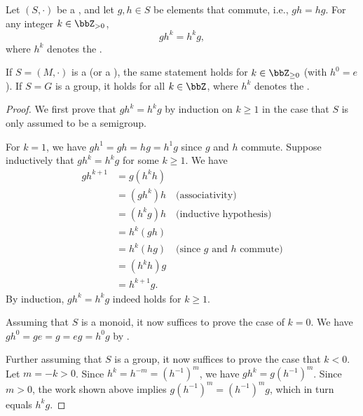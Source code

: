 \begin{lemma} \label{lemma:monoid_element_that_commutes_with_element_commutes_with_power_of_element}
    Let $(S,\cdot)$ be a , and let $g, h \in S$ be elements that commute, i.e., $gh = hg$. For any integer $k \in \bbZ_{>0}$,
    $$g h^k = h^k g,$$
    where $h^k$ denotes the .

    If $S = (M,\cdot)$ is a  (or a ), the same statement holds for $k \in \bbZ_{\geq 0}$ (with $h^0 = e$). If $S = G$ is a group, it holds for all $k \in \bbZ$, where $h^k$ denotes the .
\end{lemma}

\begin{proof}
    We first prove that $g h^k = h^k g$ by induction on $k \geq 1$ in the case that $S$ is only assumed to be a semigroup.

    For $k = 1$, we have $g h^1 = g h = h g = h^1 g$ since $g$ and $h$ commute. Suppose inductively that $g h^k = h^k g$ for some $k \ge 1$. We have
    \begin{align*}
        g h^{k+1} &= g (h^k h) \\
        &= (g h^k) h \quad\text{(associativity)} \\
        &= (h^k g) h \quad\text{(inductive hypothesis)} \\
        &= h^k (g h) \\
        &= h^k (h g) \quad\text{(since $g$ and $h$ commute)} \\
        &= (h^k h) g \\
        &= h^{k+1} g.
    \end{align*}
    By induction, $gh^k = h^kg$ indeed holds for $k \geq 1$.

    Assuming that $S$ is a monoid, it now suffices to prove the case of $k = 0$. We have $g h^0 = g e = g = e g = h^0 g$ by .

    Further assuming that $S$ is a group, it now suffices to prove the case that $k < 0$. Let $m = -k > 0$. Since $h^k = h^{-m} = (h^{-1})^m$, we have $g h^k = g (h^{-1})^m$. Since $m > 0$, the work shown above implies $g (h^{-1})^m = (h^{-1})^m g$, which in turn equals $h^k g$. 
\end{proof}